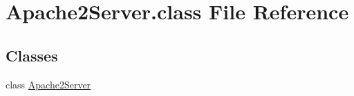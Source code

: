 \hypertarget{Apache2Server_8class}{\section{Apache2\-Server.\-class File Reference}
\label{Apache2Server_8class}
}
\subsection*{Classes}
\begin{DoxyCompactItemize}
\item 
class \hyperlink{classApache2Server}{Apache2\-Server}
\end{DoxyCompactItemize}
